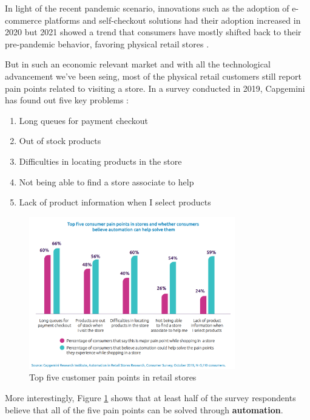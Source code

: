 \documentclass[openright]{normas-utf-tex} %
\begin{document}
In light of the recent pandemic scenario, innovations such as the adoption of
e-commerce platforms and self-checkout solutions had their adoption increased
in 2020 but 2021 showed a trend that consumers have mostly shifted back to
their pre-pandemic behavior, favoring physical retail stores \cite{Kantar2022}.

But in such an economic relevant market and with all the technological
advancement we've been seing, most of the physical retail customers still
report pain points related to visiting a store. In a survey conducted in 2019,
Capgemini has found out five key problems \cite{Capgemini2020}:

\begin{enumerate}
        \item Long queues for payment checkout
        \item Out of stock products
        \item Difficulties in locating products in the store
        \item Not being able to find a store associate to help
        \item Lack of product information when I select products
\end{enumerate}

\begin{figure}[H]
	\centering
	\includegraphics[width=0.8\textwidth]{./images/painpoints.png}
    \caption[Top five customer pain points in retail stores]{Top five customer pain points in retail stores}
    \label{fig:capgemini}
\end{figure}

More interestingly, Figure \ref{fig:capgemini} shows that at least half of the
survey respondents believe that all of the five pain points can be solved through
\textbf{automation}.
\end{document}
